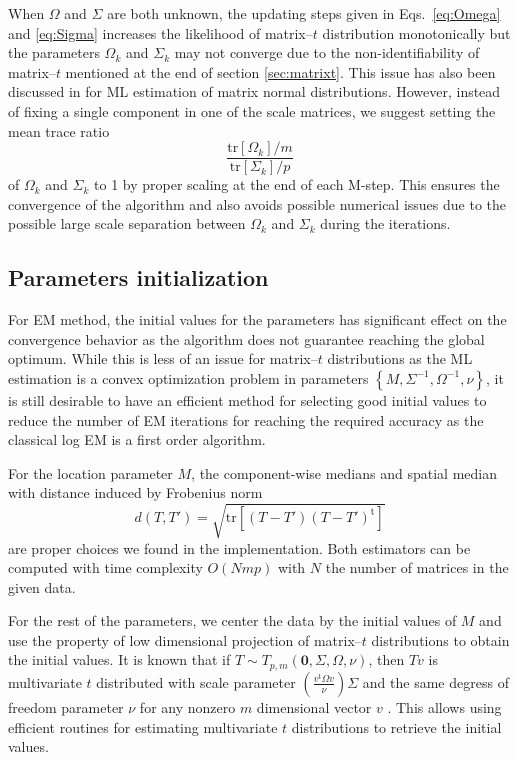 \documentclass[english,listof=totoc]{scrartcl}
\begin{document}
When $\Omega$ and $\Sigma$ are both unknown, the updating steps given in Eqs.~\eqref{eq:Omega} and \eqref{eq:Sigma} increases the likelihood of matrix--$t$ distribution monotonically but the parameters $\Omega_k$ and $\Sigma_k$ may not converge due to the non-identifiability of matrix--$t$ mentioned at the end of section \ref{sec:matrixt}. This issue has also been discussed in \citep{2013arXiv1309.6609G} for ML estimation of matrix normal distributions. However, instead of fixing a single component in one of the scale matrices, we suggest setting the mean trace ratio
\begin{equation}
\frac{\textrm{tr}[\Omega_k]/m}{\textrm{tr}[\Sigma_k]/p}
\end{equation}
of $\Omega_k$ and $\Sigma_k$ to 1 by proper scaling at the end of each M-step. This ensures the convergence of the algorithm and also avoids possible numerical issues due to the possible large scale separation between $\Omega_k$ and $\Sigma_k$ during the iterations.

\subsection{Parameters initialization}

For EM method, the initial values for the parameters has significant effect on the convergence behavior as the algorithm does not guarantee reaching the global optimum. While this is less of an issue for matrix--$t$ distributions as the ML estimation is a convex optimization problem in parameters $\left\{M,\Sigma^{-1},\Omega^{-1},\nu\right\}$, it is still desirable to have an efficient method for selecting good initial values to reduce the number of EM iterations for reaching the required accuracy as the classical log EM is a first order algorithm.

For the location parameter $M$, the component-wise medians and spatial median \citep{Vardi15022000} with distance induced by Frobenius norm
\begin{equation}
d(T,T')=\sqrt{\textrm{tr}\left[(T-T')(T-T')^{\textrm{t}}\right]}
\end{equation}
are proper choices we found in the implementation. Both estimators can be computed with time complexity $O(Nmp)$ with $N$ the number of matrices in the given data.

For the rest of the parameters, we center the data by the initial values of $M$ and use the property of low dimensional projection of matrix--$t$ distributions to obtain the initial values. It is known that if $T\sim T_{p,m}(\mathbf{0},\Sigma,\Omega,\nu)$, then $Tv$ is multivariate $t$ distributed with scale parameter $\left(\frac{v^{\textrm{t}}\Omega v}{\nu}\right)\Sigma$ and the same degress of freedom parameter $\nu$ for any nonzero $m$ dimensional vector $v$ \citep{gupta1999matrix}. This allows using efficient routines for estimating multivariate $t$ distributions to retrieve the initial values.
\end{document}
